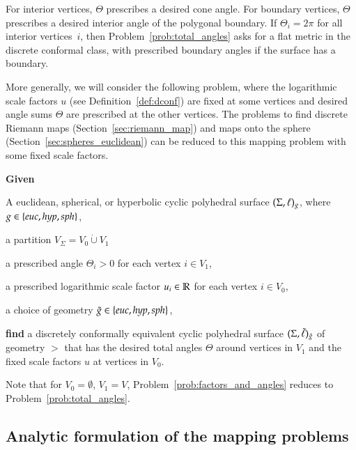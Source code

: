 \documentclass[Thesis]{subfiles}
\begin{document}
For interior vertices, $\Theta$ prescribes a desired cone angle.  For
boundary vertices, $\Theta$ prescribes a desired interior angle of the
polygonal boundary.  If $\Theta_{i}=2\pi$ for all interior
vertices~$i$, then Problem~\ref{prob:total_angles} asks for a flat
metric in the discrete conformal class, with prescribed boundary
angles if the surface has a boundary.

More generally, we will consider the following problem, where the
logarithmic scale factors $u$ (see Definition~\ref{def:dconf}) are
fixed at some vertices and desired angle sums $\Theta$ are prescribed
at the other vertices. The problems to find discrete Riemann maps
(Section~\ref{sec:riemann_map}) and maps onto the sphere
(Section~\ref{sec:spheres_euclidean}) can be reduced to this mapping problem
with some fixed scale factors.

\begin{problem}
\label{prob:factors_and_angles}
\textbf{Given}
\begin{compactitem}[$\bullet$]
\item A euclidean, spherical, or hyperbolic cyclic polyhedral surface
   $(\Sigma,\ell)_{g}$, where $\g\in\{\euc, \hyp, \sph\}$,
\item a partition $V_{\Sigma}=V_0\dot\cup V_1$
\item a prescribed angle $\Theta_{i} > 0$ for each vertex $i\in V_1$,
\item a prescribed logarithmic scale factor $u_i\in \mathbb R$ for each vertex $i\in V_0$,
\item a choice of geometry $\gt\in\{\euc, \hyp, \sph\}$,
\end{compactitem}
\noindent%
\textbf{find} a discretely conformally equivalent cyclic polyhedral surface
$(\Sigma,\tilde{\ell})_{\tilde{g}}$ of geometry $\gt$ that has the desired total angles $\Theta$
around vertices in $V_1$ and the fixed scale factors $u$ at vertices
in $V_{0}$.
\end{problem}

Note that for $V_{0}=\emptyset$, $V_{1}=V$,
Problem~\ref{prob:factors_and_angles} reduces to
Problem~\ref{prob:total_angles}.

\subsection{Analytic formulation of the mapping problems}
\label{sec:analytic}
\end{document}
